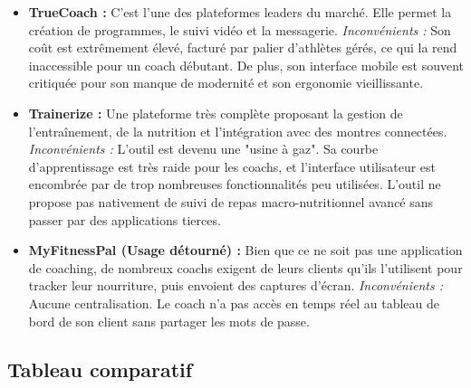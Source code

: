 \begin{itemize}
    \item \textbf{TrueCoach :} C'est l'une des plateformes leaders du marché. Elle permet la création de programmes, le suivi vidéo et la messagerie.
    \textit{Inconvénients :} Son coût est extrêmement élevé, facturé par palier d'athlètes gérés, ce qui la rend inaccessible pour un coach débutant. De plus, son interface mobile est souvent critiquée pour son manque de modernité et son ergonomie vieillissante.
    
    \item \textbf{Trainerize :} Une plateforme très complète proposant la gestion de l'entraînement, de la nutrition et l'intégration avec des montres connectées.
    \textit{Inconvénients :} L'outil est devenu une "usine à gaz". Sa courbe d'apprentissage est très raide pour les coachs, et l'interface utilisateur est encombrée par de trop nombreuses fonctionnalités peu utilisées. L'outil ne propose pas nativement de suivi de repas macro-nutritionnel avancé sans passer par des applications tierces.
    
    \item \textbf{MyFitnessPal (Usage détourné) :} Bien que ce ne soit pas une application de coaching, de nombreux coachs exigent de leurs clients qu'ils l'utilisent pour tracker leur nourriture, puis envoient des captures d'écran.
    \textit{Inconvénients :} Aucune centralisation. Le coach n'a pas accès en temps réel au tableau de bord de son client sans partager les mots de passe.
\end{itemize}

\subsection{Tableau comparatif}


